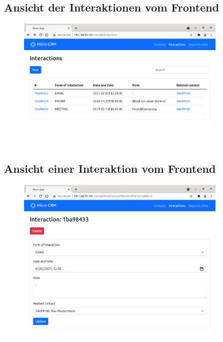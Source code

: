 \clearpage
\subsection*{Ansicht der Interaktionen vom Frontend}

\begin{figure}[H] 
    \centering
    \includegraphics[width=0.9\textwidth]{figures/FrontendInteraktionen.png}
\end{figure}

\clearpage
\subsection*{Ansicht einer Interaktion vom Frontend}

\begin{figure}[H] 
    \centering
    \includegraphics[width=0.9\textwidth]{figures/FrontendInteraktion.png}
\end{figure}

